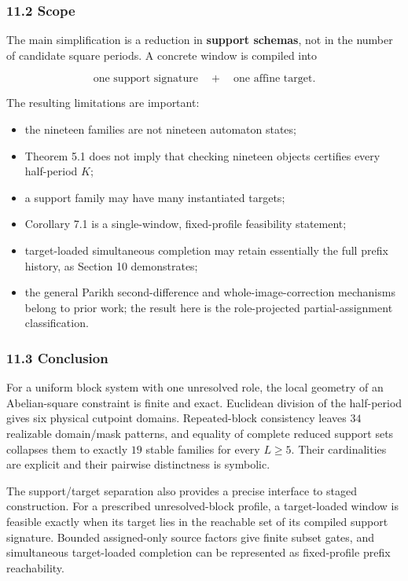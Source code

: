 \documentclass[
  british,
  a4paper,
  11pt]{article}
\providecommand{\tightlist}{%
  \setlength{\itemsep}{0pt}\setlength{\parskip}{0pt}}
\begin{document}
\subsubsection{11.2 Scope}\label{scope}

The main simplification is a reduction in \textbf{support schemas}, not
in the number of candidate square periods. A concrete window is compiled
into

\[
\text{one support signature}
\quad+\quad
\text{one affine target}.
\]

The resulting limitations are important:

\begin{itemize}
\tightlist
\item
  the nineteen families are not nineteen automaton states;
\item
  Theorem 5.1 does not imply that checking nineteen objects certifies
  every half-period \(K\);
\item
  a support family may have many instantiated targets;
\item
  Corollary 7.1 is a single-window, fixed-profile feasibility statement;
\item
  target-loaded simultaneous completion may retain essentially the full
  prefix history, as Section 10 demonstrates;
\item
  the general Parikh second-difference and whole-image-correction
  mechanisms belong to prior work; the result here is the role-projected
  partial-assignment classification.
\end{itemize}

\subsubsection{11.3 Conclusion}\label{conclusion}

For a uniform block system with one unresolved role, the local geometry
of an Abelian-square constraint is finite and exact. Euclidean division
of the half-period gives six physical cutpoint domains. Repeated-block
consistency leaves \(34\) realizable domain/mask patterns, and equality
of complete reduced support sets collapses them to exactly \(19\) stable
families for every \(L\ge5\). Their cardinalities are explicit and their
pairwise distinctness is symbolic.

The support/target separation also provides a precise interface to
staged construction. For a prescribed unresolved-block profile, a
target-loaded window is feasible exactly when its target lies in the
reachable set of its compiled support signature. Bounded assigned-only
source factors give finite subset gates, and simultaneous target-loaded
completion can be represented as fixed-profile prefix reachability.
\end{document}

